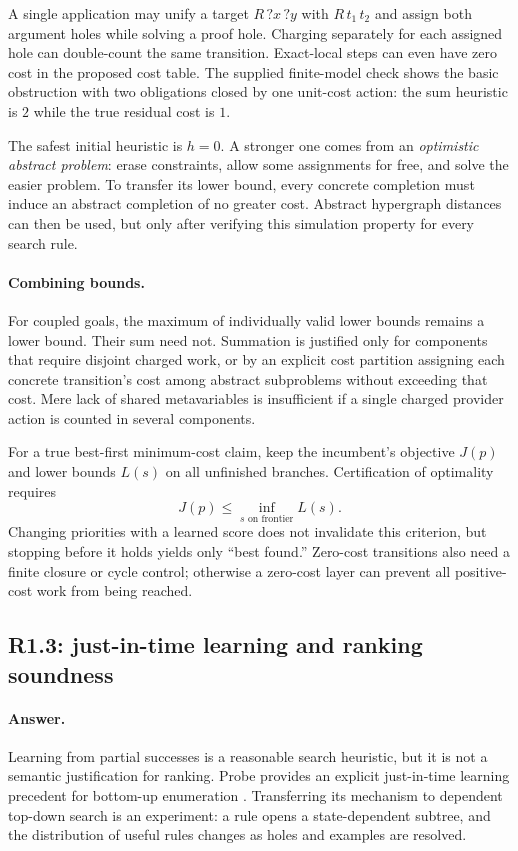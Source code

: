 \documentclass[11pt,a4paper]{article}
\newcommand{\answer}{\paragraph{Answer.}}
\theoremstyle{definition}
\theoremstyle{remark}
\begin{document}
A single application may unify a target $R\,?x\,?y$ with $R\,t_1\,t_2$ and assign
both argument holes while solving a proof hole. Charging separately for each
assigned hole can double-count the same transition. Exact-local steps can even
have zero cost in the proposed cost table. The supplied finite-model check
shows the basic obstruction with two obligations closed by one unit-cost action:
the sum heuristic is $2$ while the true residual cost is $1$.

The safest initial heuristic is $h=0$. A stronger one comes from an
\emph{optimistic abstract problem}: erase constraints, allow some assignments for
free, and solve the easier problem. To transfer its lower bound, every concrete
completion must induce an abstract completion of no greater cost. Abstract
hypergraph distances can then be used, but only after verifying this simulation
property for every search rule.

\paragraph{Combining bounds.}
For coupled goals, the maximum of individually valid lower bounds remains a
lower bound. Their sum need not. Summation is justified only for components
that require disjoint charged work, or by an explicit cost partition assigning
each concrete transition's cost among abstract subproblems without exceeding
that cost. Mere lack of shared metavariables is insufficient if a single
charged provider action is counted in several components.

For a true best-first minimum-cost claim, keep the incumbent's objective $J(p)$
and lower bounds $L(s)$ on all unfinished branches. Certification of optimality
requires
\[
 J(p)\leq\inf_{s\text{ on frontier}}L(s).
\]
Changing priorities with a learned score does not invalidate this criterion,
but stopping before it holds yields only ``best found.'' Zero-cost transitions
also need a finite closure or cycle control; otherwise a zero-cost layer can
prevent all positive-cost work from being reached.

\subsection{R1.3: just-in-time learning and ranking soundness}
\answer Learning from partial successes is a reasonable search heuristic, but it
is not a semantic justification for ranking. Probe provides an explicit
just-in-time learning precedent for bottom-up enumeration \cite{probe}.
Transferring its mechanism to dependent top-down search is an experiment: a rule
opens a state-dependent subtree, and the distribution of useful rules changes
as holes and examples are resolved.
\end{document}
